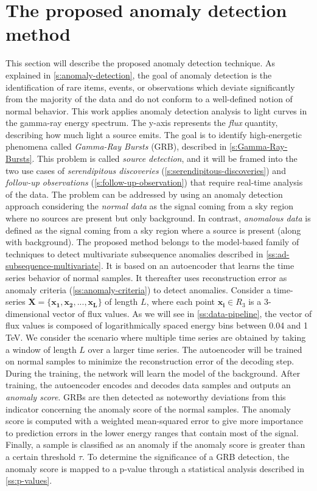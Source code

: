 \section{The proposed anomaly detection method}
\label{s:anomaly-detection}
This section will describe the proposed anomaly detection technique. As explained in \autoref{s:anomaly-detection}, the goal of anomaly detection is the identification of rare items, events, or observations which deviate significantly from the majority of the data and do not conform to a well-defined notion of normal behavior.
This work applies anomaly detection analysis to light curves in the gamma-ray energy spectrum. The y-axis represents the \textit{flux} quantity,  describing how much light a source emits. The goal is to identify high-energetic phenomena called \textit{Gamma-Ray Bursts} (GRB), described in \autoref{s:Gamma-Ray-Bursts}. This problem is called \textit{source detection}, and it will be framed into the two  use cases of \textit{serendipitous discoveries} (\autoref{s:serendipitous-discoveries}) and \textit{follow-up observations} (\autoref{s:follow-up-observation}) that require real-time analysis of the data. The problem can be addressed by using an anomaly detection approach considering the \textit{normal data} as the signal coming from a sky region where no sources are present but only background. In contrast, \textit{anomalous data} is defined as the signal coming from a sky region where a source is present (along with background).
The proposed method belongs to the model-based family of techniques to detect multivariate subsequence anomalies described in \autoref{ss:ad-subsequence-multivariate}. It is based on an autoencoder that learns the time series behavior of normal samples. It thereafter uses reconstruction error as anomaly criteria (\autoref{ss:anomaly-criteria}) to detect anomalies. 
Consider a time-series $\bm{X} = \{\bm{x_1}, \bm{x_2}, ..., \bm{x_L}\}$ of length $L$, where each point $\bm{x_i} \in R_3$ is a 3-dimensional vector of flux values. As we will see in \autoref{ss:data-pipeline}, 
the vector of flux values is composed of logarithmically spaced energy bins between 0.04 and 1 TeV. We consider the scenario where multiple  time series are obtained by taking a window of length $L$ over a larger time series. The autoencoder will be trained on normal samples to minimize the reconstruction error of the decoding step. During the training, the network will learn the model of the background. After training, the autoencoder encodes and decodes data samples and outputs an \textit{anomaly score}. GRBs are then detected as noteworthy deviations from this indicator concerning the anomaly score of the normal samples. The anomaly score is computed with a weighted mean-squared error to give more importance to prediction errors in the lower energy ranges that contain most of the signal. Finally, a sample is classified as an anomaly if the anomaly score is greater than a certain threshold $\tau$. To determine the significance of a GRB detection, the anomaly score is mapped to a p-value through a statistical analysis described in \autoref{ss:p-values}. 

